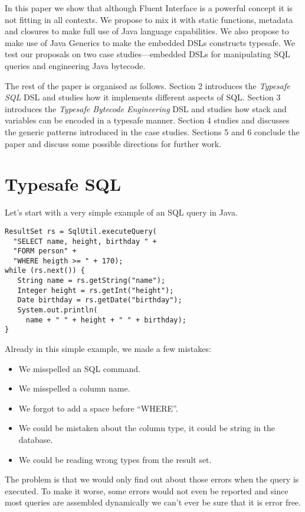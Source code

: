 \documentclass{sig-alternate}
\begin{document}
In this paper we show that although Fluent Interface is a powerful concept it is not fitting in all contexts. We propose to mix it with static functions, metadata and closures to make full use of Java language capabilities. We also propose to make use of Java Generics to make the embedded DSLs constructs typesafe. We test our proposals on two case studies---embedded DSLs for manipulating SQL queries and engineering Java bytecode.

The rest of the paper is organised as follows. Section 2 introduces the \emph{Typesafe SQL} DSL and studies how it implements different aspects of SQL. Section 3 introduces the \emph{Typesafe Bytecode Engineering} DSL and studies how stack and variables can be encoded in a typesafe manner. Section 4 studies and discusses the generic patterns introduced in the case studies. Sections 5 and 6 conclude the paper and discuss some possible directions for further work.

\section{Typesafe SQL}

Let's start with a very simple example of an SQL query in Java. 
\begin{verbatim}
ResultSet rs = SqlUtil.executeQuery(
  "SELECT name, height, birthday " + 
  "FORM person" +
  "WHERE heigth >= " + 170);
while (rs.next()) {
   String name = rs.getString("name");
   Integer height = rs.getInt("height");
   Date birthday = rs.getDate("birthday");
   System.out.println(
     name + " " + height + " " + birthday);
}
\end{verbatim}

Already in this simple example, we made a few mistakes:
\begin{itemize}
\item We misspelled an SQL command.
\item We misspelled a column name.
\item We forgot to add a space before ``WHERE''.
\item We could be mistaken about the column type, it could be string in the database.
\item We could be reading wrong types from the result set.
\end{itemize}
The problem is that we would only find out about those errors when the query is executed. To make it worse, some errors would not even be reported and since most queries are assembled dynamically we can't ever be sure that it is error free.
\end{document}
